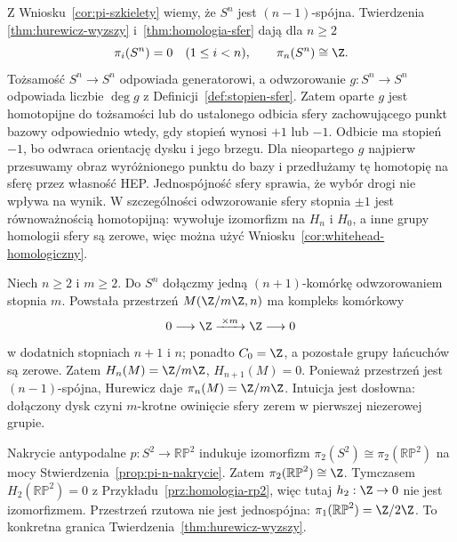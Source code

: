 \begin{przyklad}
\label{prz:pi-sfera-hurewicz}
Z Wniosku~\ref{cor:pi-szkielety}
wiemy, że $S^n$
jest $(n-1)$-spójna.
Twierdzenia
\ref{thm:hurewicz-wyzszy}
i~\ref{thm:homologia-sfer}
dają dla $n\geq2$
\[
 \pi_i(S^n)=0\quad(1\leq i<n),
 \qquad
 \pi_n(S^n)\cong\Z.
\]
Tożsamość $S^n\to S^n$
odpowiada generatorowi,
a odwzorowanie $g:S^n\to S^n$
odpowiada liczbie
$\deg g$ z
Definicji~\ref{def:stopien-sfer}.
Zatem oparte $g$ jest homotopijne do tożsamości lub do ustalonego
odbicia sfery zachowującego punkt bazowy odpowiednio wtedy,
gdy stopień wynosi $+1$ lub $-1$.
Odbicie ma stopień $-1$, bo odwraca orientację dysku i jego brzegu.
Dla nieopartego $g$ najpierw przesuwamy obraz wyróżnionego punktu do bazy
i przedłużamy tę homotopię na sferę przez własność HEP.
Jednospójność sfery sprawia, że wybór drogi nie wpływa na wynik. W szczególności
odwzorowanie sfery stopnia
$\pm1$ jest
równoważnością
homotopijną:
wywołuje izomorfizm
na $H_n$ i $H_0$,
a inne grupy homologii
sfery są zerowe,
więc można użyć
Wniosku~\ref{cor:whitehead-homologiczny}.
\end{przyklad}

\begin{przyklad}
\label{prz:moore-hurewicz}
Niech $n\geq2$ i $m\geq2$.
Do $S^n$ dołączmy
jedną $(n+1)$-komórkę
odwzorowaniem stopnia $m$.
Powstała przestrzeń
$M(\Z/m\Z,n)$ ma
kompleks komórkowy
\[
 0\longrightarrow\Z
 \xrightarrow{\;\times m\;}\Z
 \longrightarrow0
\]
w dodatnich stopniach $n+1$ i $n$; ponadto $C_0=\Z$,
a pozostałe grupy łańcuchów są zerowe. Zatem
$H_n(M)=\Z/m\Z$,
$H_{n+1}(M)=0$.
Ponieważ przestrzeń
jest $(n-1)$-spójna,
Hurewicz daje
$\pi_n(M)=\Z/m\Z$.
Intuicja jest
dosłowna: dołączony
dysk czyni
$m$-krotne
owinięcie sfery
zerem w pierwszej
niezerowej grupie.
\end{przyklad}

\begin{przyklad}
\label{prz:rp2-pi2}
Nakrycie antypodalne
$p:S^2\to\mathbb{RP}^2$
indukuje izomorfizm
$\pi_2(S^2)\cong
\pi_2(\mathbb{RP}^2)$
na mocy
Stwierdzenia~\ref{prop:pi-n-nakrycie}.
Zatem
$\pi_2(\mathbb{RP}^2)\cong\Z$.
Tymczasem
$H_2(\mathbb{RP}^2)=0$
z Przykładu~\ref{prz:homologia-rp2},
więc tutaj
$h_2:\Z\to0$
nie jest izomorfizmem.
Przestrzeń rzutowa
nie jest jednospójna:
$\pi_1(\mathbb{RP}^2)=\Z/2\Z$.
To konkretna granica
Twierdzenia~\ref{thm:hurewicz-wyzszy}.
\end{przyklad}

